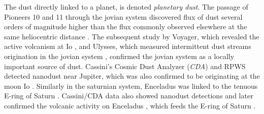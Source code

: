 The dust directly linked to a planet, is denoted \textit{planetary dust}. The passage of Pioneers 10 and 11 through the jovian system discovered flux of dust several orders of magnitude higher than the flux commonly observed elsewhere at the same heliocentric distance \citep{humes1974interplanetary}. The subsequent study by Voyager, which revealed the active volcanism at Io \citep{kruger2004jovian}, and Ulysses, which measured intermittent dust streams origination in the jovian system \citep{grun1993discovery}, confirmed the jovian system as a locally important source of dust. Cassini's Cosmic Dust Analyzer (\textit{CDA}) and RPWS detected nanodust near Jupiter, which was also confirmed to be originating at the moon Io \citep{meyer2009detecting}. Similarly in the saturnian system, Enceladus was linked to the tenuous E-ring of Saturn \citep{baum1981saturn}. Cassini/CDA data also showed nanodust detections \citep{kempf2005high} and later confirmed the volcanic activity on Enceladus \citep{spahn2006cassini}, which feeds the E-ring of Saturn \citep{kempf2010enceladus}. 

